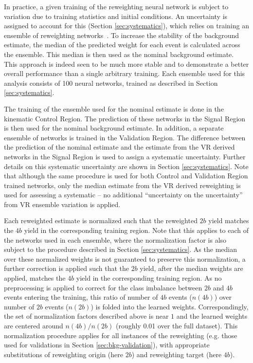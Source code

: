 In practice, a given training of the reweighting neural network is subject to variation
due to training statistics and initial conditions. An uncertainty is assigned to account
for this (Section \ref{sec:systematics}), which relies on training an ensemble of
reweighting networks~\cite{DeepEnsembles}. To increase the stability of the background estimate,
the median of the predicted weight for each event is calculated across the ensemble.
This median is then used as the nominal background estimate. This approach is indeed 
seen to be much more stable and to demonstrate a better overall performance than a 
single arbitrary training. Each ensemble used for this analysis consists of 100 
neural networks, trained as described in Section \ref{sec:systematics}.

The training of the ensemble used for the nominal estimate is done in the kinematic
Control Region. The prediction of these networks in the Signal Region is then used
for the nominal background estimate. In addition, a separate ensemble of networks is 
trained in the Validation Region. The difference between the prediction of the nominal 
estimate and the estimate from the VR derived networks in the Signal Region is used to 
assign a systematic uncertainty. Further details on this systematic uncertainty are shown 
in Section \ref{sec:systematics}.
Note that although the same procedure is used for both Control and Validation Region trained 
networks, only the median estimate from the VR derived reweighting is used for assessing a 
systematic -- no additional ``uncertainty on the uncertainty'' from 
VR ensemble variation is applied.

Each reweighted estimate is normalized such that the reweighted $2b$ yield matches the $4b$ 
yield in the corresponding training region. Note that this applies to each of the networks 
used in each ensemble, where the normalization factor is also subject to the procedure described 
in Section \ref{sec:systematics}. As the median over these normalized weights is not guaranteed 
to preserve this normalization, a further correction is applied such that the $2b$ yield, after 
the median weights are applied, matches the $4b$ yield in the corresponding training region. As no 
preprocessing is applied to correct for the class imbalance between $2b$ and $4b$ events entering 
the training, this ratio of number of $4b$ events ($n(4b)$) over number of $2b$ events ($n(2b)$) is 
folded into the learned weights. Correspondingly, the set of normalization factors described above is 
near $1$ and the learned weights are centered around $n(4b) / n(2b)$ (roughly 0.01 over the full dataset). 
This normalization procedure applies for all instances of the reweighting (e.g. those used for validations 
in Section \ref{sec:bkg-validation}), with appropriate substitutions of reweighting origin 
(here $2b$) and reweighting target (here $4b$).

